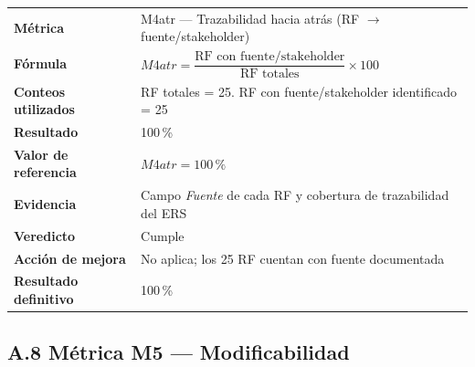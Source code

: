 \begin{tabular}{p{3.2cm}p{9.5cm}}
\hline
\textbf{Métrica} &
M4atr — Trazabilidad hacia atrás
(RF $\rightarrow$ fuente/stakeholder) \\

\textbf{Fórmula} &
$M4atr =
\dfrac{\text{RF con fuente/stakeholder}}
{\text{RF totales}}\times100$ \\

\textbf{Conteos utilizados} &
RF totales = 25. \newline
RF con fuente/stakeholder identificado = 25 \\

\textbf{Resultado} & 100\,\% \\

\textbf{Valor de referencia} & $M4atr=100\,\%$ \\

\textbf{Evidencia} &
Campo \emph{Fuente} de cada RF y cobertura de trazabilidad del ERS \\

\textbf{Veredicto} & Cumple \\

\textbf{Acción de mejora} &
No aplica; los 25 RF cuentan con fuente documentada \\

\textbf{Resultado definitivo} & 100\,\% \\

\hline
\end{tabular}

\subsection*{A.8 Métrica M5 — Modificabilidad}

